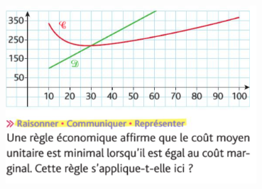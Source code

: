 \documentclass{article}
\begin{document}
\begin{center}
    \includegraphics[width=0.7\textwidth]{Exercice_4.png}
\end{center}
\end{document}
